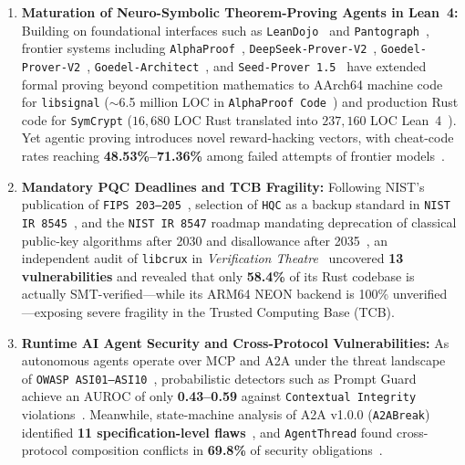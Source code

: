 \documentclass[10pt,twocolumn]{article}
\begin{document}
\begin{enumerate}
  \item \textbf{Maturation of Neuro-Symbolic Theorem-Proving Agents in Lean~4:} Building on foundational interfaces such as \texttt{LeanDojo}~\cite{yang2023leandojo} and \texttt{Pantograph}~\cite{aniva2025pantograph}, frontier systems including \texttt{AlphaProof}~\cite{hubert2025alphaproof}, \texttt{DeepSeek-Prover-V2}~\cite{ren2025deepseekproverv2}, \texttt{Goedel-Prover-V2}~\cite{lin2026goedelproverv2}, \texttt{Goedel-Architect}~\cite{chung2026goedelarchitect}, and \texttt{Seed-Prover 1.5}~\cite{chen2025seedprover15} have extended formal proving beyond competition mathematics to AArch64 machine code for \texttt{libsignal} ($\sim$6.5 million LOC in \texttt{AlphaProof Code}~\cite{chaudhuri2026alphaproofcode}) and production Rust code for \texttt{SymCrypt} ($16{,}680$ LOC Rust translated into $237{,}160$ LOC Lean~4~\cite{ho2026symcrypt}). Yet agentic proving introduces novel reward-hacking vectors, with cheat-code rates reaching \textbf{48.53\%--71.36\%} among failed attempts of frontier models~\cite{yang2026proofgate,ye2026verina,ammanamanchi2026faults}.
  \item \textbf{Mandatory PQC Deadlines and TCB Fragility:} Following NIST's publication of \texttt{FIPS 203--205}~\cite{nist2024fips203,nist2024fips204,nist2024fips205}, selection of \texttt{HQC} as a backup standard in \texttt{NIST IR 8545}~\cite{alagic2025nistir8545}, and the \texttt{NIST IR 8547} roadmap mandating deprecation of classical public-key algorithms after 2030 and disallowance after 2035~\cite{moody2026nistir8547}, an independent audit of \texttt{libcrux} in \emph{Verification Theatre}~\cite{kobeissi2026theatre} uncovered \textbf{13 vulnerabilities} and revealed that only \textbf{58.4\%} of its Rust codebase is actually SMT-verified---while its ARM64 NEON backend is 100\% unverified---exposing severe fragility in the Trusted Computing Base (TCB).
  \item \textbf{Runtime AI Agent Security and Cross-Protocol Vulnerabilities:} As autonomous agents operate over MCP and A2A under the threat landscape of \texttt{OWASP ASI01--ASI10}~\cite{owasp2025agentic,kim2026sok}, probabilistic detectors such as Prompt Guard achieve an AUROC of only \textbf{0.43--0.59} against \texttt{Contextual Integrity} violations~\cite{abdelnabi2026ci}. Meanwhile, state-machine analysis of A2A v1.0.0 (\texttt{A2ABreak}) identified \textbf{11 specification-level flaws}~\cite{lotfi2026a2abreak}, and \texttt{AgentThread} found cross-protocol composition conflicts in \textbf{69.8\%} of security obligations~\cite{agentthread2026}.
\end{enumerate}
\end{document}

